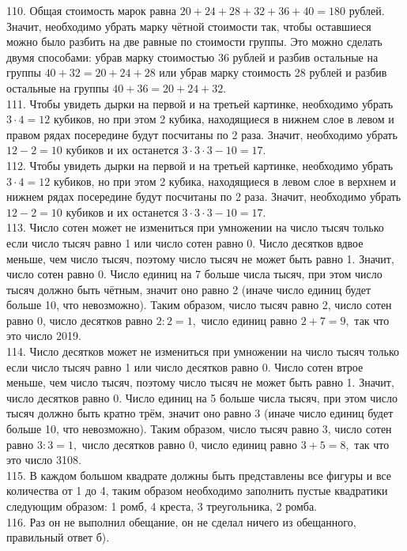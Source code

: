 110. Общая стоимость марок равна $20+24+28+32+36+40=180$ рублей. Значит, необходимо убрать марку чётной стоимости так, чтобы оставшиеся можно было разбить на две равные по стоимости группы. Это можно сделать двумя способами: убрав марку стоимостью 36 рублей и разбив остальные на группы $40+32=20+24+28$ или убрав марку стоимость 28 рублей и разбив остальные на группы $40+36=20+24+32.$\\
111. Чтобы увидеть дырки на первой и на третьей картинке, необходимо убрать $3\cdot4=12$ кубиков, но при этом 2 кубика, находящиеся в нижнем слое в левом и правом рядах посередине будут посчитаны по 2 раза. Значит, необходимо убрать $12-2=10$ кубиков и их останется $3\cdot3\cdot3-10=17.$\\
112. Чтобы увидеть дырки на первой и на третьей картинке, необходимо убрать $3\cdot4=12$ кубиков, но при этом 2 кубика, находящиеся в левом слое в верхнем и нижнем рядах посередине будут посчитаны по 2 раза. Значит, необходимо убрать $12-2=10$ кубиков и их останется $3\cdot3\cdot3-10=17.$\\
113. Число сотен может не измениться при умножении на число тысяч только если число тысяч равно 1 или число сотен равно 0. Число десятков вдвое меньше, чем число тысяч, поэтому число тысяч не может быть равно 1. Значит, число сотен равно 0. Число единиц на 7 больше числа тысяч, при этом число тысяч должно быть чётным, значит оно равно 2 (иначе число единиц будет больше 10, что невозможно). Таким образом, число тысяч равно 2, число сотен равно 0, число десятков равно $2:2=1,$ число единиц равно $2+7=9,$ так что это число 2019.\\
114. Число десятков может не измениться при умножении на число тысяч только если число тысяч равно 1 или число десятков равно 0. Число сотен втрое меньше, чем число тысяч, поэтому число тысяч не может быть равно 1. Значит, число десятков равно 0. Число единиц на 5 больше числа тысяч, при этом число тысяч должно быть кратно трём, значит оно равно 3 (иначе число единиц будет больше 10, что невозможно). Таким образом, число тысяч равно 3, число сотен равно $3:3=1,$ число десятков равно 0, число единиц равно $3+5=8,$ так что это число 3108.\\
115. В каждом большом квадрате должны быть представлены все фигуры и все количества от 1 до 4, таким образом необходимо заполнить пустые квадратики следующим образом: 1 ромб, 4 креста, 3 треугольника, 2 ромба.\\
116. Раз он не выполнил обещание, он не сделал ничего из обещанного, правильный ответ б).\\
